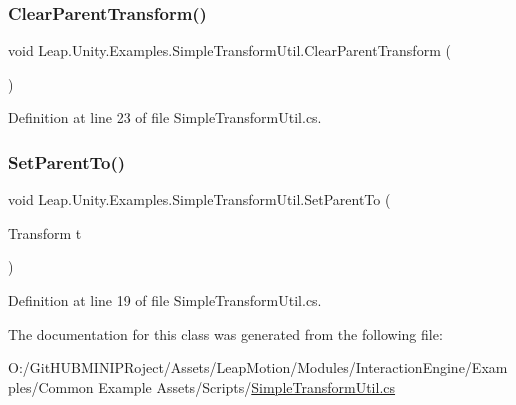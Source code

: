 \subsubsection{\texorpdfstring{ClearParentTransform()}{ClearParentTransform()}}
{\footnotesize\ttfamily void Leap.\+Unity.\+Examples.\+Simple\+Transform\+Util.\+Clear\+Parent\+Transform (\begin{DoxyParamCaption}{ }\end{DoxyParamCaption})}



Definition at line 23 of file Simple\+Transform\+Util.\+cs.

\mbox{\label{class_leap_1_1_unity_1_1_examples_1_1_simple_transform_util_af7050fcf910fa82dae60d06ddb8133bb}} 
\subsubsection{\texorpdfstring{SetParentTo()}{SetParentTo()}}
{\footnotesize\ttfamily void Leap.\+Unity.\+Examples.\+Simple\+Transform\+Util.\+Set\+Parent\+To (\begin{DoxyParamCaption}\item[{Transform}]{t }\end{DoxyParamCaption})}



Definition at line 19 of file Simple\+Transform\+Util.\+cs.



The documentation for this class was generated from the following file\+:\begin{DoxyCompactItemize}
\item 
O\+:/\+Git\+H\+U\+B\+M\+I\+N\+I\+P\+Roject/\+Assets/\+Leap\+Motion/\+Modules/\+Interaction\+Engine/\+Examples/\+Common Example Assets/\+Scripts/\mbox{\hyperlink{_simple_transform_util_8cs}{Simple\+Transform\+Util.\+cs}}\end{DoxyCompactItemize}
